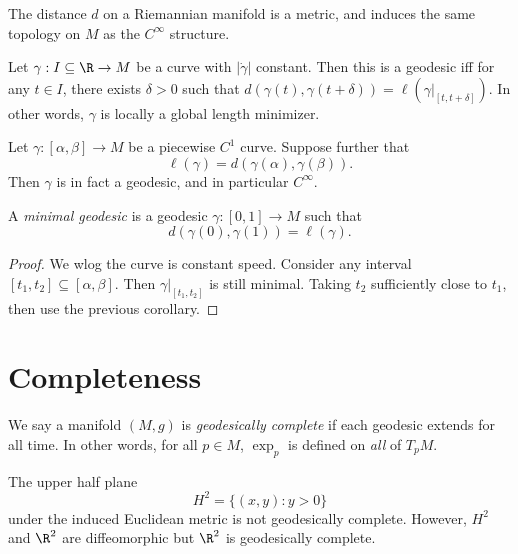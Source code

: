 \documentclass[a4paper]{article}
\begin{document}
\begin{cor}
  The distance $d$ on a Riemannian manifold is a metric, and induces the same topology on $M$ as the $C^\infty$ structure.
\end{cor}

\begin{cor}
  Let $\gamma: I \subseteq \R \to M$ be a curve with $|\dot{\gamma}|$ constant. Then this is a geodesic iff for any $t \in I$, there exists $\delta > 0$ such that $d(\gamma(t), \gamma(t + \delta)) = \ell(\gamma|_{ [t, t + \delta]})$. In other words, $\gamma$ is locally a global length minimizer.
\end{cor}

\begin{prop}
  Let $\gamma: [\alpha, \beta] \to M$ be a piecewise $C^1$ curve. Suppose further that
  \[
    \ell(\gamma) = d(\gamma(\alpha), \gamma(\beta)).
  \]
  Then $\gamma$ is in fact a geodesic, and in particular $C^\infty$.
\end{prop}

\begin{defi}
  A \emph{minimal geodesic} is a geodesic $\gamma: [0, 1] \to M$ such that
  \[
    d(\gamma(0), \gamma(1)) = \ell(\gamma).
  \]
\end{defi}

\begin{proof}
  We wlog the curve is constant speed. Consider any interval $[t_1, t_2] \subseteq [\alpha, \beta]$. Then $\gamma|_{[t_1, t_2]}$ is still minimal. Taking $t_2$ sufficiently close to $t_1$, then use the previous corollary.
\end{proof}

\section{Completeness}
\begin{defi}
  We say a manifold $(M, g)$ is \emph{geodesically complete} if each geodesic extends for all time. In other words, for all $p \in M$, $\exp_p$ is defined on \emph{all} of $T_p M$.
\end{defi}

\begin{eg}
  The upper half plane
  \[
    H^2 = \{(x, y) : y> 0\}
  \]
  under the induced Euclidean metric is not geodesically complete. However, $H^2$ and $\R^2$ are diffeomorphic but $\R^2$ is geodesically complete.
\end{eg}
\end{document}
